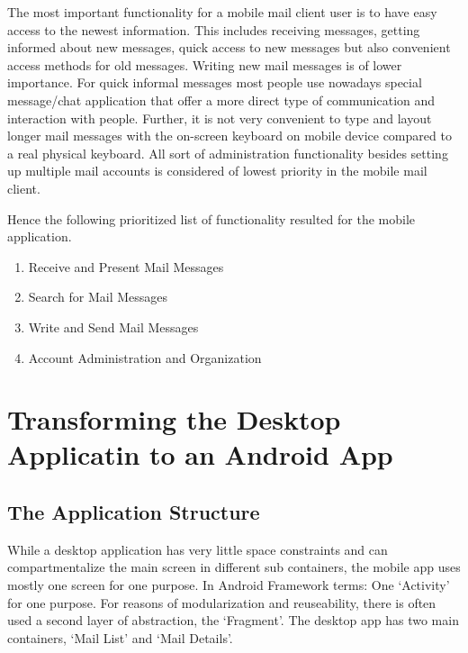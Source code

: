 \documentclass[a4paper,11pt,twoside]{article}
\begin{document}
The most important functionality for a mobile mail client user is to have easy
access to the newest information. This includes receiving messages, getting
informed about new messages, quick access to new messages but also convenient
access methods for old messages. Writing new mail messages is of lower
importance. For quick informal messages most people use nowadays special
message/chat application that offer a more direct type of communication and
interaction with people. Further, it is not very convenient to type and layout
longer mail messages with the on-screen keyboard on mobile device compared to a
real physical keyboard. All sort of administration functionality besides setting
up multiple mail accounts is considered of lowest priority in the mobile mail
client.

Hence the following prioritized list of functionality resulted for the mobile
application.
\begin{enumerate}
  \item Receive and Present Mail Messages
  \item Search for Mail Messages
  \item Write and Send Mail Messages
  \item Account Administration and Organization
\end{enumerate}



\section{Transforming the Desktop Applicatin to an Android App}
\subsection{The Application Structure}
While a desktop application has very little space constraints and can
compartmentalize the main screen in different sub containers, the mobile app
uses mostly one screen for one purpose. In Android Framework terms: One `Activity'
for one purpose. For reasons of modularization and
reuseability, there is often used a second layer of abstraction, the
`Fragment'.  The desktop app has two main containers, `Mail List' and `Mail
Details'.
\end{document}
